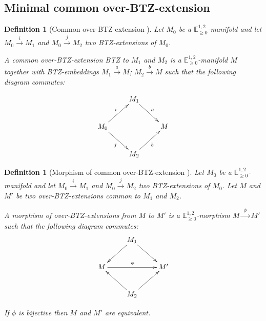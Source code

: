\documentclass[a4paper,12pt]{article}
\newcommand{\mass}[1]{{\mathbb E}^{1,2}_{#1}}
\newtheorem{defou}[lemou]{Definition}    %
\begin{document}
\subsection{Minimal common over-BTZ-extension}
		\begin{defou}[Common over-BTZ-extension ]\label{btzdef:common_over_btz_extension} Let $M_0$ be a $\mass{\geq0}$-mani\-fold and let $M_0\xrightarrow{i} M_1$ and $M_0 \xrightarrow{j} M_2$
			two BTZ-extensions  of $M_0$. 

		A common over-BTZ-extension BTZ to $M_1$ and $M_2$ is a  $\mass{\geq0}$-manifold $M$ together with BTZ-embeddings
		$M_1\xrightarrow{a} M$; $M_2 \xrightarrow{b} M$ such that the following diagram commutes:

		$$
			\xymatrix{
				& M_1&\\
				M_0\ar[ur]^i \ar[dr]_j&&M\ar@{<-}[ul]_{a}\ar@{<-}[dl]^{b} \\
				& M_2&
			}		
		$$

		\end{defou}

		\begin{defou}[Morphism of common over-BTZ-extension ]\label{btzdef:morphism_common_over_btz_extension}
		Let $M_0$ be a $\mass{\geq0}$-manifold and let $M_0\xrightarrow{i} M_1$ and $M_0 \xrightarrow{j} M_2$
			two BTZ-extensions  of $M_0$.  Let $M$ and $M'$ be two over-BTZ-extensions common to $M_1$ and $M_2$.

		A morphism of over-BTZ-extensions from $M$ to $M'$ is a $\mass{\geq0}$-morphism $M\xrightarrow{~~\phi~~} M'$
		 such that the following diagram commutes:
		$$
			\xymatrix{
					&M_1 &\\
				M\ar@{<-}[ur]\ar@{<-}[dr]\ar[rr]^\phi& &M'\ar@{<-}[ul]\ar@{<-}[dl]\\
				& M_2 &
			}		
		$$

		If $\phi$ is bijective then $M$ and $M'$ are equivalent. 	
		\end{defou}
\end{document}
